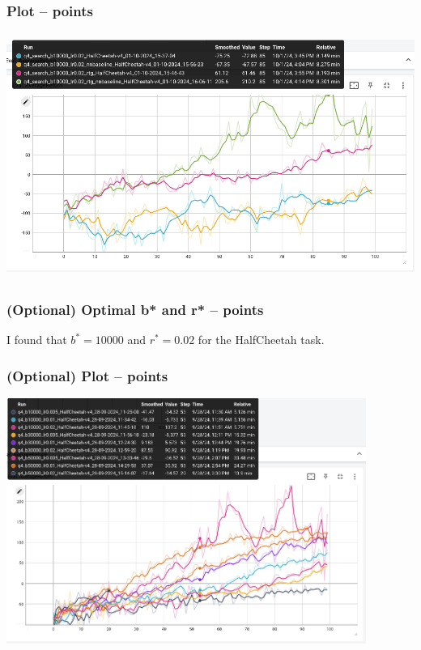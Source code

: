 \documentclass{article}
\begin{document}
\subsubsection{Plot --  points\rbrack}
\begin{answer}[title=Q7.2.2,height=10cm,width=\linewidth]
\centering
\includegraphics[height=8cm]{figures/q41.png}
\end{answer}

\subsubsection{(Optional) Optimal b* and r* --  points\rbrack}
\begin{answer}[title=Q7.2.3,height=4cm,width=\linewidth]
I found that $b^* = 10000$ and $r^* = 0.02$ for the HalfCheetah task.
\end{answer}

\subsubsection{(Optional) Plot --  points\rbrack}
\begin{answer}[title=Q7.2.4,height=10cm,width=\linewidth]
\centering
\includegraphics[height=8cm]{figures/q42.png}
\end{answer}
\end{document}
